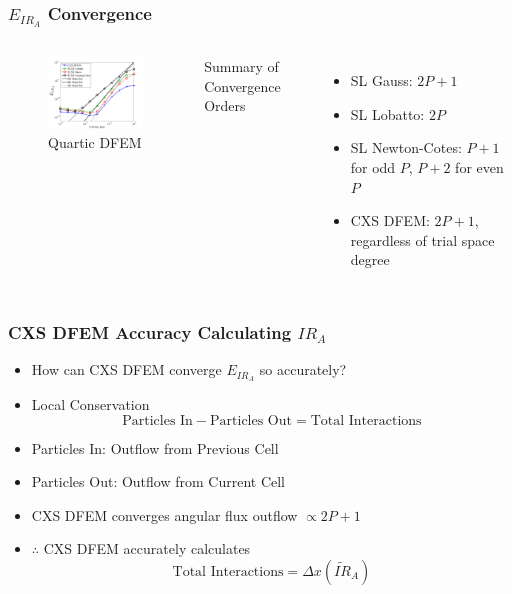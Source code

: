 \documentclass{beamer}
\newcommand{\be}{\begin{equation*}}   %
\newcommand{\ee}{\end{equation*}}
\begin{document}
\begin{frame}
\frametitle{$E_{IR_A}$ Convergence}
\begin{columns}[c]
\begin{figure}
\includegraphics[width = 5cm]{../chapter3_variable_xs/P4_VarXS_E_I_A.png}
\caption{Quartic DFEM}
\end{figure}
Summary of Convergence Orders
\begin{itemize}
\item SL Gauss: $2P+1$
\item SL Lobatto: $2P$
\item SL Newton-Cotes: $P+1$ for odd $P$, $P+2$ for even $P$
\item CXS DFEM: $2P+1$, regardless of trial space degree
\end{itemize}
\end{columns}
\end{frame}

\begin{frame}
\frametitle{CXS DFEM Accuracy Calculating $IR_A$}
\begin{itemize}
\item How can CXS DFEM converge $E_{IR_A}$ so accurately?
\item Local Conservation
\be
\text{Particles In} - \text{Particles Out} =  \text{Total Interactions} 
\ee
\item Particles In: Outflow from Previous Cell
\item Particles Out: Outflow from Current Cell
\item CXS DFEM converges angular flux outflow $\propto 2P+1$
\item $\therefore$ CXS DFEM accurately calculates
\be
\text{Total Interactions} =\Delta x \left( \widetilde{IR}_A \right)
\ee
\end{itemize}
\end{frame}
\end{document}
